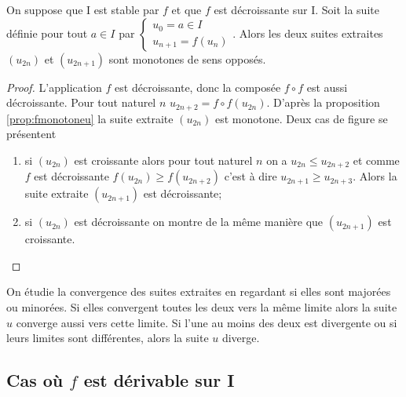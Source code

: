 \begin{prop}
  On suppose que I est stable par \(f\) et que \(f\) est décroissante sur I. 
  Soit la suite définie pour tout \(a \in I\) par \(\begin{cases} u_0=a \in I \\ 
  u_{n+1}=f(u_n) \end{cases}\). Alors les deux suites extraites \((u_{2n})\) et 
  \((u_{2n+1})\) sont monotones de sens opposés.
\end{prop}
\begin{proof}
  L'application \(f\) est décroissante, donc la composée \(f \circ f\) est aussi 
  décroissante. Pour tout naturel \(n\) \(u_{2n+2}=f \circ f(u_{2n})\). D'après 
  la proposition~
  \ref{prop:fmonotoneu} la suite extraite \((u_{2n})\) est monotone. Deux cas de 
  figure se présentent
  \begin{enumerate}
    \item si \((u_{2n})\) est croissante alors pour tout naturel \(n\) on a 
      \(u_{2n} \leqslant u_{2n+2}\) et comme \(f\) est décroissante \(f(u_{2n}) 
      \geqslant f(u_{2n+2})\) c'est à dire \(u_{2n+1} \geqslant u_{2n+3}\). 
      Alors la suite extraite \((u_{2n+1})\) est décroissante;
    \item si \((u_{2n})\) est décroissante on montre de la même manière que 
      \((u_{2n+1})\) est croissante.
  \end{enumerate}
\end{proof}

On étudie la convergence des suites extraites en regardant si elles sont 
majorées ou minorées. Si elles convergent toutes les deux vers la même limite 
alors la suite \(u\) converge aussi vers cette limite. Si l'une au moins des 
deux est divergente ou si leurs limites sont différentes, alors la suite \(u\) 
diverge.

\subsection{Cas où \(f\) est dérivable sur I}

